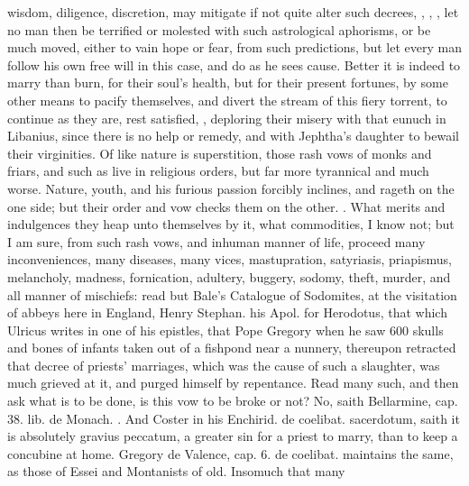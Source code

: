 wisdom, diligence, discretion, may mitigate if not quite alter such
decrees, , , \etc{}, let no man then be terrified or molested
with such astrological aphorisms, or be much moved, either to vain hope
or fear, from such predictions, but let every man follow his own free
will in this case, and do as he sees cause. Better it is indeed to
marry than burn, for their soul's health, but for their present
fortunes, by some other means to pacify themselves, and divert the
stream of this fiery torrent, to continue as they are, rest
satisfied, , deploring their
misery with that eunuch in Libanius, since there is no help or remedy,
and with Jephtha's daughter to bewail their virginities.
Of like nature is superstition, those rash vows of monks and friars,
and such as live in religious orders, but far more tyrannical and much
worse. Nature, youth, and his furious passion forcibly inclines, and
rageth on the one side; but their order and vow checks them on the
other. . What merits and
indulgences they heap unto themselves by it, what commodities, I know
not; but I am sure, from such rash vows, and inhuman manner of life,
proceed many inconveniences, many diseases, many vices, mastupration,
satyriasis, priapismus, melancholy, madness, fornication,
adultery, buggery, sodomy, theft, murder, and all manner of mischiefs:
read but Bale's Catalogue of Sodomites, at the visitation of abbeys
here in England, Henry Stephan. his Apol. for Herodotus, that which
Ulricus writes in one of his epistles, that Pope Gregory when he
saw 600 skulls and bones of infants taken out of a fishpond near a
nunnery, thereupon retracted that decree of priests' marriages, which
was the cause of such a slaughter, was much grieved at it, and purged
himself by repentance. Read many such, and then ask what is to be done,
is this vow to be broke or not? No, saith Bellarmine, \textlatin{cap. 38. lib.
de Monach.} . And Coster in his
\textlatin{Enchirid. de coelibat. sacerdotum}, saith it is absolutely gravius
peccatum, a greater sin for a priest to marry, than to
keep a concubine at home. Gregory de Valence, cap. 6. de coelibat. maintains
the same, as those of Essei and Montanists of old. Insomuch that many
